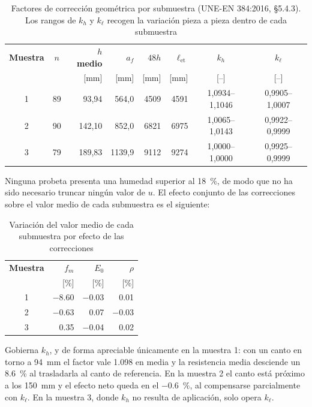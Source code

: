 \documentclass[11pt,a4paper]{article}
\newcommand{\fm}{f_{m}}
\newcommand{\Ecero}{E_{0}}
\newcommand{\lonet}{\ell_{\mathrm{et}}}   %
\begin{document}
\begin{table}[H]
\centering
\caption[Factores de corrección geométrica por submuestra (UNE-EN 384:2016, \S5.4.3)]{Factores de corrección geométrica por submuestra (UNE-EN 384:2016, \S5.4.3). Los rangos de $k_{h}$ y $k_{\ell}$ recogen la variación pieza a pieza dentro de cada submuestra}
\begin{tabular}{c c r r r r c c}
\toprule
\textbf{Muestra} & \textbf{$n$} & \textbf{$h$ medio} & \textbf{$a_{f}$} & \textbf{$48h$} & \textbf{$\lonet$} & \textbf{$k_{h}$} & \textbf{$k_{\ell}$} \\
 & & [mm] & [mm] & [mm] & [mm] & [--] & [--] \\
\midrule
1 & 89 & 93,94 & 564,0 & 4509 & 4591 & 1,0934--1,1046 & 0,9905--1,0007 \\
2 & 90 & 142,10 & 852,0 & 6821 & 6975 & 1,0065--1,0143 & 0,9922--0,9999 \\
3 & 79 & 189,83 & 1139,9 & 9112 & 9274 & 1,0000--1,0000 & 0,9925--0,9999 \\
\bottomrule
\end{tabular}
\end{table}

\noindent Ninguna probeta presenta una humedad superior al \SI{18}{\percent}, de modo
que no ha sido necesario truncar ningún valor de $u$. El efecto conjunto de las
correcciones sobre el valor medio de cada submuestra es el siguiente:

\begin{table}[H]
\centering
\caption[Variación del valor medio de cada submuestra por efecto de las correcciones]{Variación del valor medio de cada submuestra por efecto de las correcciones}
\begin{tabular}{c r r r}
\toprule
\textbf{Muestra} & \textbf{$\fm$} & \textbf{$\Ecero$} & \textbf{$\rho$} \\
 & [\%] & [\%] & [\%] \\
\midrule
1 & \num{-8,60} & \num{-0,03} & \num{0,01} \\
2 & \num{-0,63} & \num{0,07} & \num{-0,03} \\
3 & \num{0,35} & \num{-0,04} & \num{0,02} \\
\bottomrule
\end{tabular}
\end{table}

\noindent Gobierna $k_{h}$, y de forma apreciable únicamente en la muestra 1: con un
canto en torno a \SI{94}{\milli\meter} el factor vale \num{1,098} en media y la resistencia
media desciende un \SI{8,6}{\percent} al trasladarla al canto de referencia. En la
muestra 2 el canto está próximo a los \SI{150}{\milli\meter} y el efecto neto queda en
el \SI{-0,6}{\percent}, al compensarse parcialmente con $k_{\ell}$. En la muestra 3,
donde $k_{h}$ no resulta de aplicación, solo opera $k_{\ell}$.
\end{document}
